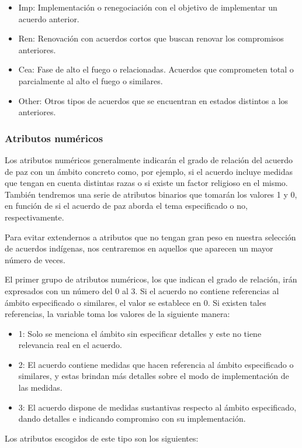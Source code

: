 \documentclass[11pt]{article}
\providecommand{\tightlist}{%
      \setlength{\itemsep}{0pt}\setlength{\parskip}{0pt}}
\begin{document}
\begin{itemize}
\begin{itemize}
   \item Imp: Implementación o renegociación con el objetivo de implementar un acuerdo anterior.
   
   \item Ren: Renovación con acuerdos cortos que buscan renovar los compromisos anteriores.
   
   \item Cea: Fase de alto el fuego o relacionadas. Acuerdos que comprometen total o parcialmente al alto el fuego o similares.

    \item Other: Otros tipos de acuerdos que se encuentran en estados distintos a los anteriores.
   \end{itemize}
\end{itemize}

\subsubsection{Atributos numéricos \label{num}}

Los atributos numéricos generalmente indicarán el grado de relación del acuerdo de paz con un ámbito concreto como, por ejemplo, si el acuerdo incluye medidas que tengan en cuenta distintas razas o si existe un factor religioso en el mismo. También tendremos una serie de atributos binarios que tomarán los valores 1 y 0, en función de si el acuerdo de paz aborda el tema especificado o no, respectivamente.

Para evitar extendernos a atributos que no tengan gran peso en nuestra selección de acuerdos indígenas, nos centraremos en aquellos que aparecen un mayor número de veces. 

El primer grupo de atributos numéricos, los que indican el grado de relación, irán expresados con un número del 0 al 3. Si el acuerdo no contiene referencias al ámbito especificado o similares, el valor se establece en 0. Si existen tales
referencias, la variable toma los valores de la siguiente manera:

\begin{itemize}
\tightlist
\item
  1: Solo se menciona el ámbito sin especificar detalles y este no tiene
  relevancia real en el acuerdo.
\item
  2: El acuerdo contiene medidas que hacen referencia al ámbito
  especificado o similares, y estas brindan más detalles sobre el modo
  de implementación de las medidas.
\item
  3: El acuerdo dispone de medidas sustantivas respecto
  al ámbito especificado, dando detalles e indicando compromiso con su
  implementación.
\end{itemize}
    Los atributos escogidos de este tipo son los siguientes:
\end{document}
